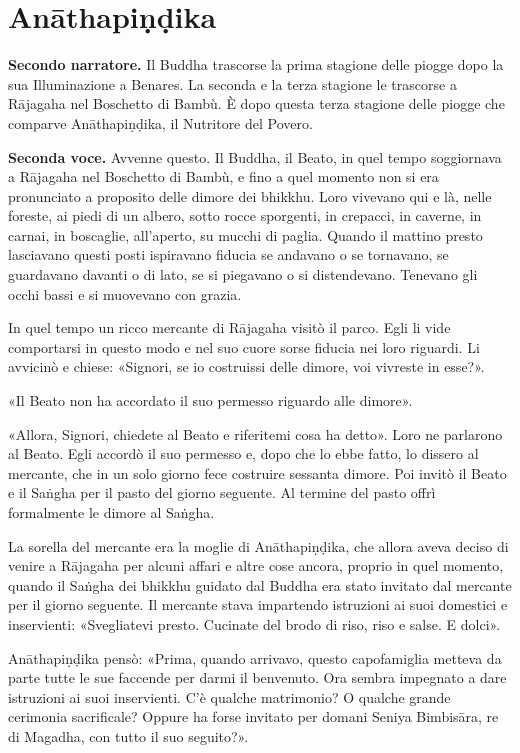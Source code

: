\chapter{Anāthapiṇḍika}

\textbf{Secondo narratore.} Il Buddha trascorse la prima stagione delle piogge
dopo la sua Illuminazione a Benares. La seconda e la terza stagione le
trascorse a Rājagaha nel Boschetto di Bambù. È dopo questa terza
stagione delle piogge che comparve Anāthapiṇḍika, il Nutritore del
Povero.


\textbf{Seconda voce.} Avvenne questo. Il Buddha, il Beato, in quel tempo
soggiornava a Rājagaha nel Boschetto di Bambù, e fino a quel momento non
si era pronunciato a proposito delle dimore dei bhikkhu. Loro vivevano
qui e là, nelle foreste, ai piedi di un albero, sotto rocce sporgenti,
in crepacci, in caverne, in carnai, in boscaglie, all’aperto, su mucchi
di paglia. Quando il mattino presto lasciavano questi posti ispiravano
fiducia se andavano o se tornavano, se guardavano davanti o di lato, se
si piegavano o si distendevano. Tenevano gli occhi bassi e si muovevano
con grazia.


In quel tempo un ricco mercante di Rājagaha visitò il parco. Egli li
vide comportarsi in questo modo e nel suo cuore sorse fiducia nei loro
riguardi. Li avvicinò e chiese: «Signori, se io costruissi delle dimore,
voi vivreste in esse?».


«Il Beato non ha accordato il suo permesso riguardo alle dimore».


«Allora, Signori, chiedete al Beato e riferitemi cosa ha detto». Loro ne
parlarono al Beato. Egli accordò il suo permesso e, dopo che lo ebbe
fatto, lo dissero al mercante, che in un solo giorno fece costruire
sessanta dimore. Poi invitò il Beato e il Saṅgha per il pasto del giorno
seguente. Al termine del pasto offrì formalmente le dimore al Saṅgha.


La sorella del mercante era la moglie di Anāthapiṇḍika, che allora aveva
deciso di venire a Rājagaha per alcuni affari e altre cose ancora,
proprio in quel momento, quando il Saṅgha dei bhikkhu guidato dal Buddha
era stato invitato dal mercante per il giorno seguente. Il mercante
stava impartendo istruzioni ai suoi domestici e inservienti:
«Svegliatevi presto. Cucinate del brodo di riso, riso e salse. E dolci».


Anāthapiṇḍika pensò: «Prima, quando arrivavo, questo capofamiglia
metteva da parte tutte le sue faccende per darmi il benvenuto. Ora
sembra impegnato a dare istruzioni ai suoi inservienti. C’è qualche
matrimonio? O qualche grande cerimonia sacrificale? Oppure ha forse
invitato per domani Seniya Bimbisāra, re di Magadha, con tutto il suo
seguito?».


